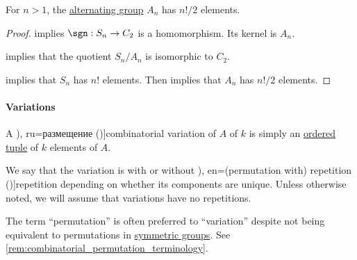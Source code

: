 \begin{proposition}\label{thm:alternating_group_cardinality}
  For \( n > 1 \), the \hyperref[def:alternating_group]{alternating group} \( A_n \) has \( n! / 2 \) elements.
\end{proposition}
\begin{proof}
   implies \( \sgn: S_n \to C_2 \) is a homomorphism. Its kernel is \( A_n \).

   implies that the quotient \( S_n / A_n \) is isomorphic to \( C_2 \).

   implies that \( S_n \) has \( n! \) elements. Then  implies that \( A_n \) has \( n! / 2 \) elements.
\end{proof}

\paragraph{Variations}

\begin{definition}\label{def:combinatorial_variation}\mimprovised
  A \term[bg=вариация (\cite[27]{ДимитровЯнев2007ВероятностиИСтатистика}), ru=размещение (\cite[171]{Яблонский2003ДискретнаяМатематика})]{combinatorial variation} of \( A \) of  \( k \) is simply an \hyperref[def:ordered_tuple]{ordered tuple} of \( k \) elements of \( A \).

  We say that the variation is with or without \term[bg=(вариация с) повторение (\cite[27]{ДимитровЯнев2007ВероятностиИСтатистика}), en=(permutation with) repetition (\cite[446]{Rosen2019DiscreteMathematics})]{repetition} depending on whether its components are unique. Unless otherwise noted, we will assume that variations have no repetitions.
\end{definition}
\begin{comments}
  \item The term \enquote{permutation} is often preferred to \enquote{variation} despite not being equivalent to permutations in \hyperref[def:symmetric_group]{symmetric groups}. See \cref{rem:combinatorial_permutation_terminology}.
\end{comments}

